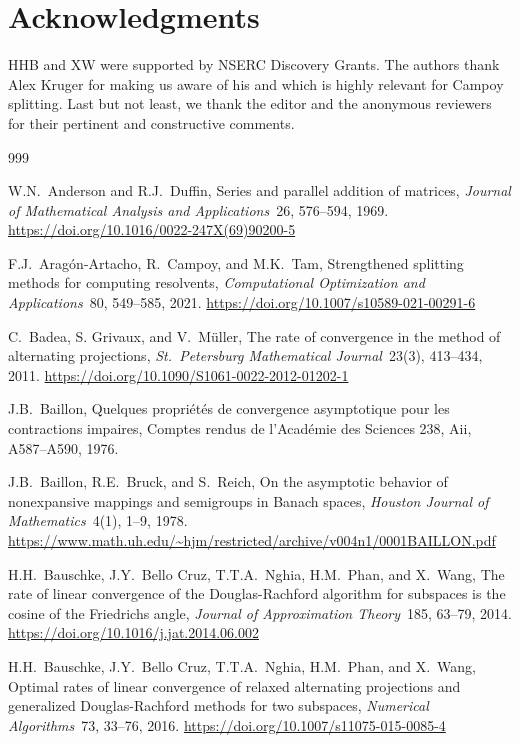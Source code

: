 \documentclass[11pt]{article}
\theoremstyle{definition}
\begin{document}
{\section*{Acknowledgments}
HHB and XW were supported by NSERC Discovery Grants. 
The authors thank Alex Kruger for making us aware of his \cite{Kruger81} and \cite{Kruger85} 
which is highly relevant for Campoy splitting. 
{\color{black}
Last but not least, we thank the editor and the anonymous reviewers for their pertinent and constructive comments. 
}

\begin{thebibliography}{999}

W.N.\ Anderson and R.J.\ Duffin,
Series and parallel addition of matrices,
\emph{Journal of Mathematical Analysis and Applications}~26, 576--594, 1969. 
\url{
https://doi.org/10.1016/0022-247X(69)90200-5}

F.J.\ Arag\'on-Artacho, R.\ Campoy, and M.K.\ Tam, 
Strengthened splitting methods for computing resolvents,
\emph{Computational Optimization and Applications}~80,  549--585, 2021.
\url{https://doi.org/10.1007/s10589-021-00291-6}

C.\ Badea, S. Grivaux, and V.\ M\"uller, 
The rate of convergence in the method of alternating projections,
\emph{St.\ Petersburg Mathematical Journal}~23(3), 413--434, 2011.
\url{https://doi.org/10.1090/S1061-0022-2012-01202-1}

J.B.\ Baillon,
Quelques propri\'et\'es de convergence asymptotique pour les contractions impaires, Comptes rendus de l'Acad\'emie des Sciences 238, Aii, A587--A590, 1976. 

J.B.\ Baillon, R.E.\ Bruck, and S.\ Reich,
On the asymptotic behavior of nonexpansive mappings
and semigroups in Banach spaces,
\emph{Houston Journal of Mathematics}~4(1), 1--9, 1978. 
\url{https://www.math.uh.edu/~hjm/restricted/archive/v004n1/0001BAILLON.pdf}

H.H.\ Bauschke, J.Y.\ Bello Cruz, T.T.A.\ Nghia, H.M.\ Phan, 
and X.\ Wang,
The rate of linear convergence of the Douglas-Rachford
algorithm for subspaces is the cosine of the Friedrichs angle,
\emph{Journal of Approximation Theory}~185, 63--79, 2014.
\url{https://doi.org/10.1016/j.jat.2014.06.002}

H.H.\ Bauschke, J.Y.\ Bello Cruz, T.T.A.\ Nghia, H.M.\ Phan, 
and X.\ Wang,
Optimal rates of linear convergence of relaxed 
alternating projections and generalized Douglas-Rachford 
methods for two subspaces, 
\emph{Numerical Algorithms}~73, 33--76, 2016.
\url{https://doi.org/10.1007/s11075-015-0085-4}


\end{thebibliography}}
\end{document}

